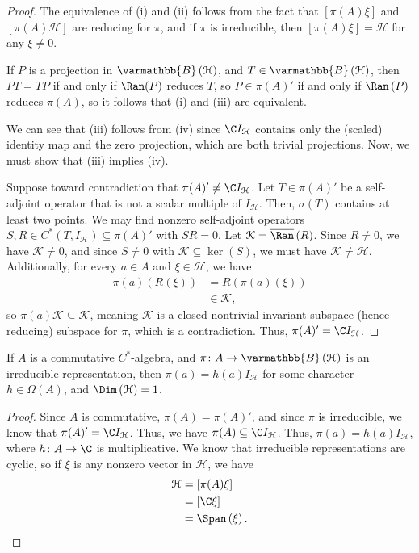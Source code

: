 \documentclass[10pt]{mypackage}
\renewcommand*{\mathbb}[1]{\varmathbb{#1}}
\newcommand{\B}{\mathbb{B}}
\begin{document}
\begin{proof}
  The equivalence of (i) and (ii) follows from the fact that $\left[\pi(A)\xi\right]$ and $\left[\pi(A)\mathcal{H}\right]$ are reducing for $\pi$, and if $\pi$ is irreducible, then $\left[\pi(A)\xi\right] = \mathcal{H}$ for any $\xi\neq 0$.\newline

  If $P$ is a projection in $\B\left(\mathcal{H}\right)$, and $T\in \B\left(\mathcal{H}\right)$, then $PT = TP$ if and only if $\Ran(P)$ reduces $T$, so $P\in \pi(A)'$ if and only if $\Ran\left(P\right)$ reduces $\pi(A)$, so it follows that (i) and (iii) are equivalent.\newline

  We can see that (iii) follows from (iv) since $\C I_{\mathcal{H}}$ contains only the (scaled) identity map and the zero projection, which are both trivial projections. Now, we must show that (iii) implies (iv).\newline

  Suppose toward contradiction that $\pi(A)' \neq \C I_{\mathcal{H}}$. Let $T\in \pi(A)'$ be a self-adjoint operator that is not a scalar multiple of $I_{\mathcal{H}}$. Then, $\sigma(T)$ contains at least two points. We may find nonzero self-adjoint operators $S,R\in C^{\ast}\left(T,I_{\mathcal{H}}\right)\subseteq \pi(A)'$ with $SR = 0$. Let $\mathcal{K} = \overline{\Ran}\left(R\right)$. Since $R \neq 0$, we have $\mathcal{K}\neq 0$, and since $S\neq 0$ with $\mathcal{K}\subseteq \ker\left(S\right)$, we must have $\mathcal{K}\neq \mathcal{H}$. Additionally, for every $a\in A$ and $\xi\in \mathcal{H}$, we have
  \begin{align*}
    \pi(a)\left(R\left(\xi\right)\right) &= R\left(\pi(a)\left(\xi\right)\right)\\
                                         &\in \mathcal{K},
  \end{align*}
  so $\pi(a)\mathcal{K}\subseteq \mathcal{K}$, meaning $\mathcal{K}$ is a closed nontrivial invariant subspace (hence reducing) subspace for $\pi$, which is a contradiction. Thus, $\pi(A)' = \C I_{\mathcal{H}}$.
\end{proof}
\begin{corollary}
  If $A$ is a commutative $C^{\ast}$-algebra, and $\pi\colon A\rightarrow \B\left(\mathcal{H}\right)$ is an irreducible representation, then $\pi(a) = h(a)I_{\mathcal{H}}$ for some character $h\in \Omega\left(A\right)$, and $\Dim\left(\mathcal{H}\right) = 1$.
\end{corollary}
\begin{proof}
  Since $A$ is commutative, $\pi(A) = \pi(A)'$, and since $\pi$ is irreducible, we know that $\pi(A)' = \C I_{\mathcal{H}}$. Thus, we have $\pi(A) \subseteq \C I_{\mathcal{H}}$. Thus, $\pi(a) = h(a) I_{\mathcal{H}}$, where $h\colon A\rightarrow \C$ is multiplicative. We know that irreducible representations are cyclic, so if $\xi$ is any nonzero vector in $\mathcal{H}$, we have
  \begin{align*}
    \mathcal{H} &= \left[\pi(A)\xi\right]\\
                &= \left[\C\xi\right]\\
                &= \Span\left(\xi\right).
  \end{align*}
\end{proof}
\end{document}
